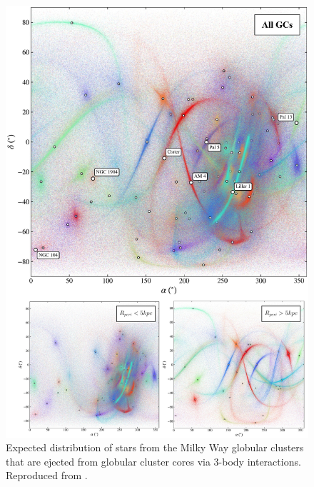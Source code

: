             \begin{figure}
                \includegraphics[width=\linewidth]{images/grondin_et_al_core_spray.jpeg}
                \caption{Expected distribution of stars from the Milky Way globular clusters that are ejected from globular cluster cores via 3-body interactions. Reproduced from \citet{2024MNRAS.528.5189G}.}
                \label{fig:grondin_et_al_core_spray}
            \end{figure}            

